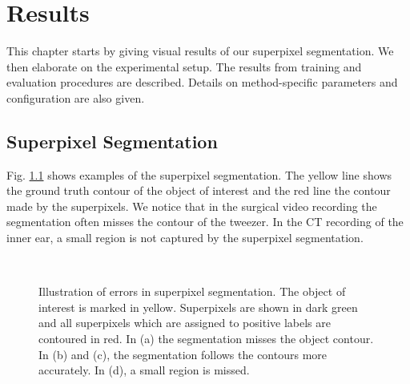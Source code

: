 %
%
%

\chapter{Results}
This chapter starts by giving visual results of our superpixel segmentation. We then elaborate on the experimental setup. The results from training and evaluation procedures are described. Details on method-specific parameters and configuration are also given.

\section{Superpixel Segmentation}
Fig. \ref{fig:sp_example} shows examples of the superpixel segmentation. The yellow line shows the ground truth contour of the object of interest and the red line the contour made by the superpixels. We notice that in the surgical video recording the segmentation often misses the contour of the tweezer. In the CT recording of the inner ear, a small region is not captured by the superpixel segmentation. 

\begin{figure}[htbp]
  \centering
  \hspace{2cm}
  \\
  \hspace{2cm}
  \caption[Superpixel segmentation example]{Illustration of errors in superpixel segmentation. The object of interest is marked in yellow. Superpixels are shown in dark green and all superpixels which are assigned to positive labels are contoured in red. In (a) the segmentation misses the object contour. In (b) and (c), the segmentation follows the contours more accurately. In (d), a small region is missed.}
  \label{fig:sp_example}
\end{figure}

